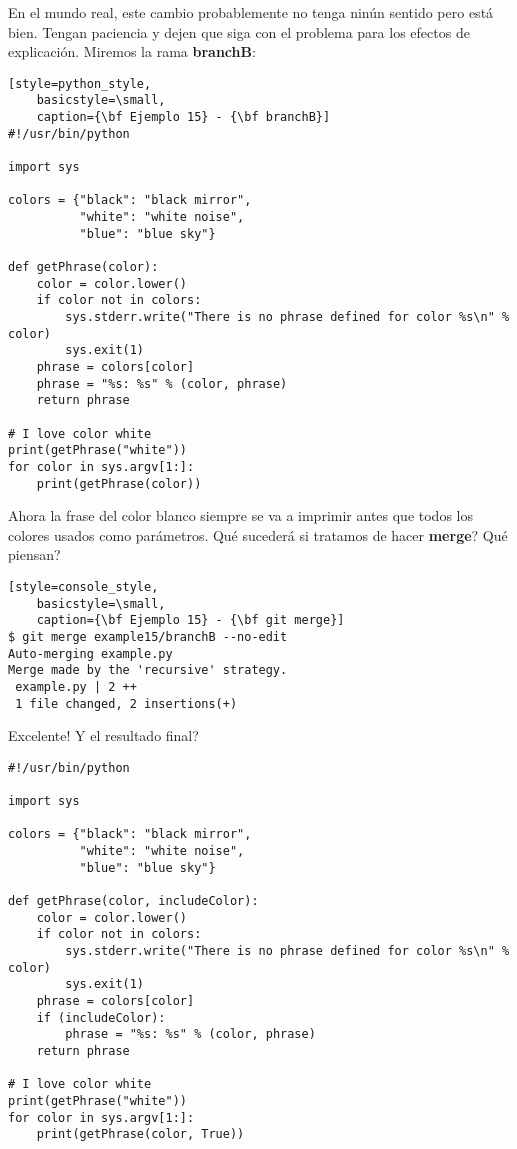 En el mundo real, este cambio probablemente no tenga ninún sentido pero está bien. Tengan paciencia y dejen que siga con el problema
para los efectos de explicación. Miremos la rama {\bf branchB}:

\begin{lstlisting}[style=python_style,
	basicstyle=\small,
	caption={\bf Ejemplo 15} - {\bf branchB}]
#!/usr/bin/python

import sys

colors = {"black": "black mirror",
          "white": "white noise",
          "blue": "blue sky"}

def getPhrase(color):
    color = color.lower()
    if color not in colors:
        sys.stderr.write("There is no phrase defined for color %s\n" % color)
        sys.exit(1)
    phrase = colors[color]
    phrase = "%s: %s" % (color, phrase)
    return phrase

# I love color white
print(getPhrase("white"))
for color in sys.argv[1:]:
    print(getPhrase(color))
\end{lstlisting}

Ahora la frase del color blanco siempre se va a imprimir antes que todos los colores usados como parámetros. Qué sucederá si tratamos
de hacer {\bf merge}? Qué piensan?

\begin{lstlisting}[style=console_style,
	basicstyle=\small,
	caption={\bf Ejemplo 15} - {\bf git merge}]
$ git merge example15/branchB --no-edit
Auto-merging example.py
Merge made by the 'recursive' strategy.
 example.py | 2 ++
 1 file changed, 2 insertions(+)
\end{lstlisting}

Excelente! Y el resultado final?

\begin{lstlisting}[style=python_style,
	basicstyle=\small,
	caption={\bf Ejemplo 15} - resultado final]
#!/usr/bin/python

import sys

colors = {"black": "black mirror",
          "white": "white noise",
          "blue": "blue sky"}

def getPhrase(color, includeColor):
    color = color.lower()
    if color not in colors:
        sys.stderr.write("There is no phrase defined for color %s\n" % color)
        sys.exit(1)
    phrase = colors[color]
    if (includeColor):
        phrase = "%s: %s" % (color, phrase)
    return phrase

# I love color white
print(getPhrase("white"))
for color in sys.argv[1:]:
    print(getPhrase(color, True))
\end{lstlisting}


